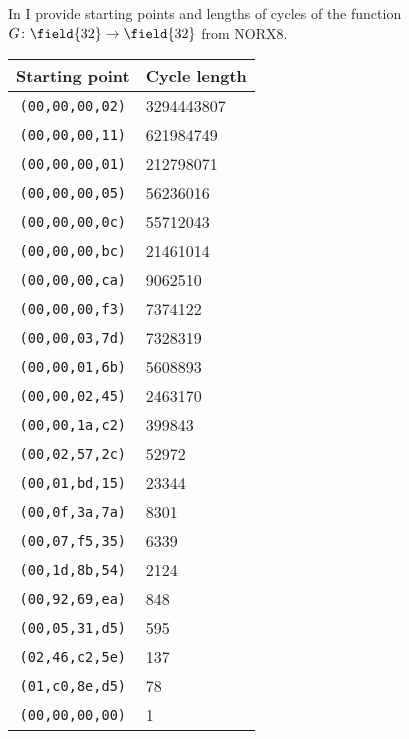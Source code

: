 In  I provide starting points and lengths of cycles of the function $G\colon \field{32} \to \field{32}$ from NORX8.

\begin{table}[ht]
\begin{center}
\setlength{\tabcolsep}{.2cm}
\begin{tabular}{c|l}

Starting point & Cycle length \\

\midrule

\texttt{(00,00,00,02)} & 3294443807 \\
\texttt{(00,00,00,11)} & 621984749 \\
\texttt{(00,00,00,01)} & 212798071 \\
\texttt{(00,00,00,05)} & 56236016 \\
\texttt{(00,00,00,0c)} & 55712043 \\
\texttt{(00,00,00,bc)} & 21461014 \\
\texttt{(00,00,00,ca)} & 9062510 \\
\texttt{(00,00,00,f3)} & 7374122 \\
\texttt{(00,00,03,7d)} & 7328319 \\
\texttt{(00,00,01,6b)} & 5608893 \\
\texttt{(00,00,02,45)} & 2463170 \\
\texttt{(00,00,1a,c2)} & 399843 \\
\texttt{(00,02,57,2c)} & 52972 \\
\texttt{(00,01,bd,15)} & 23344 \\
\texttt{(00,0f,3a,7a)} & 8301 \\
\texttt{(00,07,f5,35)} & 6339 \\
\texttt{(00,1d,8b,54)} & 2124 \\
\texttt{(00,92,69,ea)} & 848 \\
\texttt{(00,05,31,d5)} & 595 \\
\texttt{(02,46,c2,5e)} & 137 \\
\texttt{(01,c0,8e,d5)} & 78 \\
\texttt{(00,00,00,00)} & 1 \\

\end{tabular}
\end{center}
\end{table}
